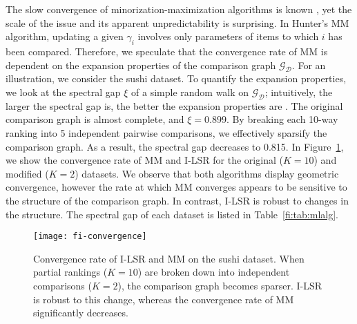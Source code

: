 The slow convergence of minorization-maximization algorithms is known \citep{hunter2004mm}, yet the scale of the issue and its apparent unpredictability is surprising.
In Hunter's MM algorithm, updating a given $\gamma_i$ involves only parameters of items to which $i$ has been compared.
Therefore, we speculate that the convergence rate of MM is dependent on the expansion properties of the comparison graph $\mathcal{G}_{\mathcal{D}}$.
For an illustration, we consider the sushi dataset.
To quantify the expansion properties, we look at the spectral gap $\xi$ of a simple random walk on $\mathcal{G}_{\mathcal{D}}$;
intuitively, the larger the spectral gap is, the better the expansion properties are \citep{levin2008markov}.
The original comparison graph is almost complete, and $\xi = 0.899$.
By breaking each \num{10}-way ranking into \num{5} independent pairwise comparisons, we effectively sparsify the comparison graph.
As a result, the spectral gap decreases to \num{0.815}.
In Figure~\ref{fi:fig:convergence}, we show the convergence rate of MM and I-LSR for the original ($K = 10$) and modified ($K = 2$) datasets.
We observe that both algorithms display geometric convergence, however the rate at which MM converges appears to be sensitive to the structure of the comparison graph.
In contrast, I-LSR is robust to changes in the structure.
The spectral gap of each dataset is listed in Table~\ref{fi:tab:mlalg}.


\begin{figure}
\centering
\texttt{[image: fi-convergence]}
\caption{
Convergence rate of I-LSR and MM on the sushi dataset.
When partial rankings ($K = 10$) are broken down into independent comparisons ($K = 2$), the comparison graph becomes sparser.
I-LSR is robust to this change, whereas the convergence rate of MM significantly decreases.
}
\label{fi:fig:convergence}
\end{figure}

